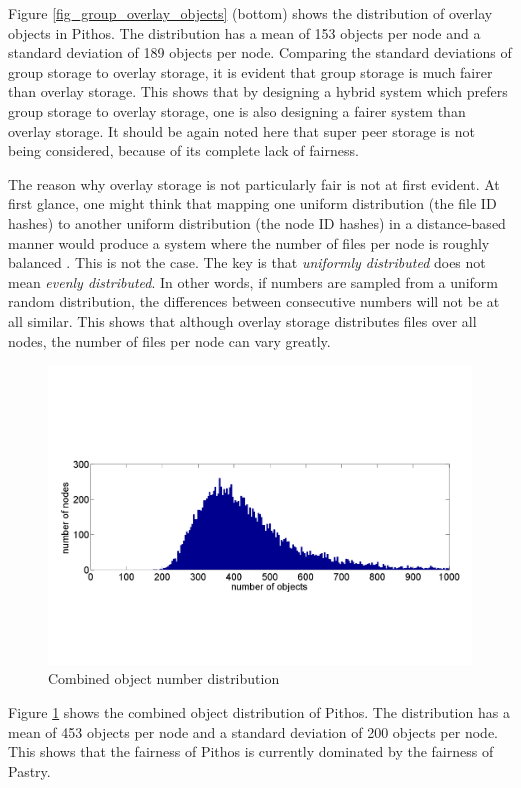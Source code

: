 \documentclass[10pt,a4paper,conference]{IEEEtran}
\begin{document}
%
Figure \ref{fig_group_overlay_objects} (bottom) shows the distribution of overlay objects in Pithos. The distribution has a mean of 153 objects per
node and a standard deviation of 189 objects per node. Comparing the standard deviations of group storage to overlay storage, it is evident that
group storage is much fairer than overlay storage. This shows that by designing a hybrid system which prefers group storage to overlay storage, one
is also designing a fairer system than overlay storage. It should be again noted here that super peer storage is not being considered, because of its
complete lack of fairness.

The reason why overlay storage is not particularly fair is not at first evident. At first glance, one might think that mapping one uniform
distribution (the file ID hashes) to another uniform distribution (the node ID hashes) in a distance-based manner would produce a system where the
number of files per node is roughly balanced \cite{storage_and_chaching_PAST}. This is not the case. The key is that \emph{uniformly distributed}
does not mean \emph{evenly distributed}. In other words, if numbers are sampled from a uniform random distribution, the differences between
consecutive numbers will not be at all similar. This shows that although overlay storage distributes files over all nodes, the number of files per
node can vary greatly.

\begin{figure}[htbp]
 \centering
 \includegraphics[clip=true, viewport=1cm 5cm 29cm 14.5cm, width=\columnwidth]{Objects}
 \caption{Combined object number distribution}
 \label{fig_objects}
\end{figure}
%
Figure \ref{fig_objects} shows the combined object distribution of Pithos. The distribution has a mean of 453 objects per node and a standard
deviation of 200 objects per node. This shows that the fairness of Pithos is currently dominated by the fairness of Pastry.
\end{document}
